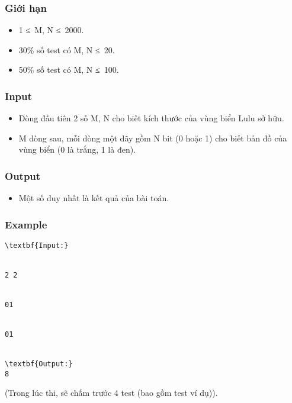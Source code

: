 \subsubsection{   Giới hạn  }
\begin{itemize}
	\item     1 ≤ M, N ≤ 2000.   
	\item     30\% số test có M, N ≤ 20.   
	\item     50\% số test có M, N ≤ 100.   
\end{itemize}
\begin{itemize}
\end{itemize}

\subsubsection{   Input  }
\begin{itemize}
	\item     Dòng đầu tiên 2 số M, N cho biết kích thước của vùng biển Lulu sở hữu.   
	\item     M dòng sau, mỗi dòng một dãy gồm N bit (0 hoặc 1) cho biết bản đồ của vùng biển (0 là trắng, 1 là đen).   
\end{itemize}

\subsubsection{   Output  }
\begin{itemize}
	\item     Một số duy nhất là kết quả của bài toán.   
\end{itemize}
\begin{itemize}
\end{itemize}

\subsubsection{   Example  }
\begin{verbatim}
\textbf{Input:}


2 2


01


01


\textbf{Output:}
8\end{verbatim}

(Trong lúc thi, sẽ chấm trước 4 test (bao gồm test ví dụ)).
